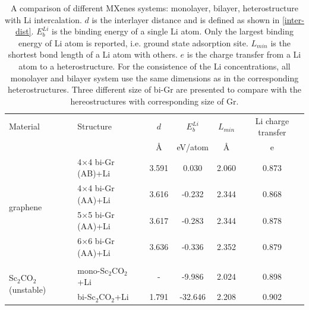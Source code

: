\begin{table}[htbp]
{\footnotesize
\centering
\caption{A comparison of different MXenes systems: monolayer, bilayer, heterostructure with Li intercalation. $d$ is the interlayer distance and is defined as shown in \autoref{inter-dist}. $E_b^{Li}$ is the binding energy of a single Li atom. Only the largest binding energy of Li atom is reported, i.e. ground state adsorption site. $L_{min}$ is the shortest bond length of a Li atom with others. $e$ is the charge transfer from a Li atom to a heterostructure. For the consistence of the Li concentrations, all monolayer and bilayer system use the same dimensions as in the corresponding heterostructures. Three different size of bi-Gr are presented to compare with the hereostructures with corresponding size of Gr.} 
\label{my-label}
\begin{tabularx}{\textwidth}{llcccc}
\hline
Material      & Structure                         & $d$                & $E_b^{Li}$               & $L_{min}$ & Li charge transfer   \\
              &                                   & \AA                       & eV/atom                             & \AA                       & e                \\ \hline
\multirow{4}{*}{graphene}      & 4$\times$4 bi-Gr (AB)+Li                 & 3.591                    & 0.030                          & 2.060                     & 0.873                        \\
              & 4$\times$4 bi-Gr (AA)+Li                 & 3.616                                                                            & -0.232                         & 2.344                     & 0.868                        \\
              & 5$\times$5 bi-Gr (AA)+Li                  & 3.617                                                                          & -0.283                         & 2.344                     & 0.878                        \\
              & 6$\times$6 bi-Gr (AA)+Li                  & 3.636                                                                         & -0.336                         & 2.352                     & 0.879                        \\ 
& & & & \\              
\multirow{3}{*}{Sc$_2$CO$_2$ (unstable)}    & mono-Sc$_2$CO$_2$+Li  & -  & -9.986  & 2.024  & 0.898 \\
              & bi-Sc$_2$CO$_2$+Li   & 1.791              & -32.646 & 2.208  & 0.902 \\

\end{tabularx}}
\end{table}
